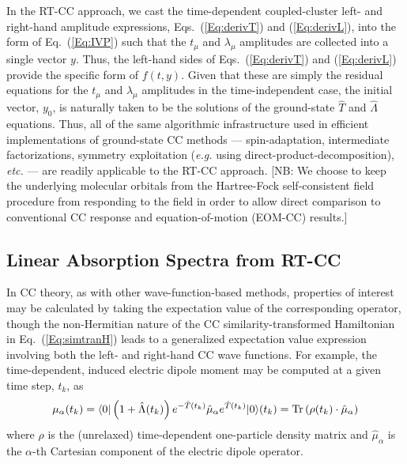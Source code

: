 In the RT-CC approach, we cast the time-dependent coupled-cluster left- and
right-hand amplitude expressions, Eqs.~(\ref{Eq:derivT}) and
(\ref{Eq:derivL}), into the form of Eq.~(\ref{Eq:IVP}) such that the $t_\mu$
and $\lambda_\mu$ amplitudes are collected into a single vector $y$.  Thus,
the left-hand sides of Eqs.~(\ref{Eq:derivT}) and (\ref{Eq:derivL}) provide
the specific form of $f(t, y)$.  Given that these are simply the residual
equations for the $t_\mu$ and $\lambda_\mu$ amplitudes in the time-independent
case, the initial vector, $y_0$, is naturally taken to be the solutions of the
ground-state $\hat{T}$ and $\hat{\Lambda}$ equations.  Thus, all of the same
algorithmic infrastructure used in efficient implementations of ground-state
CC methods --- spin-adaptation, intermediate factorizations, symmetry
exploitation (\textit{e.g.} using
direct-product-decomposition\cite{Stanton1991}), \textit{etc.} --- are readily applicable to the
RT-CC approach.  [NB: We choose to keep the underlying molecular orbitals from
the Hartree-Fock self-consistent field procedure from responding to the field
in order to allow direct comparison to conventional CC response and
equation-of-motion (EOM-CC) results.]

\subsection{Linear Absorption Spectra from RT-CC} \label{theory_2}

In CC theory, as with other wave-function-based methods, properties of
interest may be calculated by taking the expectation value of the
corresponding operator, though the non-Hermitian nature of the CC
similarity-transformed Hamiltonian in Eq.~(\ref{Eq:simtranH}) leads to a
generalized expectation value expression involving both the left- and
right-hand CC wave functions.  For example, the time-dependent, induced
electric dipole moment may be computed at a given time step, $t_k$, as
\begin{equation}\label{eq:dipole} \mu_{\alpha}(t_{k})=\langle0 | \left(1 +
\hat{\Lambda}(t_{k})\right) e^{-\hat{T}(t_k)}\hat{\mu}_\alpha e^{\hat{T}(t_k)}
| 0 \rangle(t_{k}) = \textrm{Tr}\left(\rho(t_{k})\cdot\hat{\mu}_\alpha\right)
\end{equation} where $\rho$ is the (unrelaxed) time-dependent one-particle
density matrix and $\hat{\mu}_\alpha$ is the $\alpha$-th Cartesian component
of the electric dipole operator.

